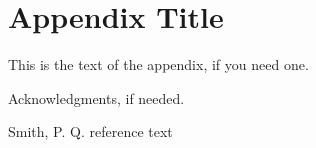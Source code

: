 \documentclass[preprint,natbib]{sigplanconf}
\begin{document}
\appendix
\section{Appendix Title}

This is the text of the appendix, if you need one.

\acks

Acknowledgments, if needed.



\begin{thebibliography}{}

Smith, P. Q. reference text

\end{thebibliography}
\end{document}
